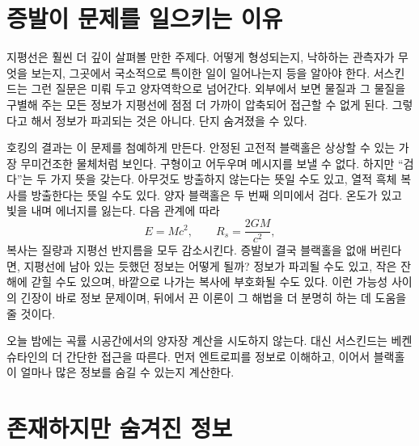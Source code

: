 \begin{classroomqa}\end{classroomqa}

\section{증발이 문제를 일으키는 이유}

지평선은 훨씬 더 깊이 살펴볼 만한 주제다. 어떻게 형성되는지, 낙하하는 관측자가 무엇을 보는지, 그곳에서 국소적으로 특이한 일이 일어나는지 등을 알아야 한다. 서스킨드는 그런 질문은 미뤄 두고 양자역학으로 넘어간다. 외부에서 보면 물질과 그 물질을 구별해 주는 모든 정보가 지평선에 점점 더 가까이 압축되어 접근할 수 없게 된다. 그렇다고 해서 정보가 파괴되는 것은 아니다. 단지 숨겨졌을 수 있다.

호킹의 결과는 이 문제를 첨예하게 만든다. 안정된 고전적 블랙홀은 상상할 수 있는 가장 무미건조한 물체처럼 보인다. 구형이고 어두우며 메시지를 보낼 수 없다. 하지만 ``검다''는 두 가지 뜻을 갖는다. 아무것도 방출하지 않는다는 뜻일 수도 있고, 열적 흑체 복사를 방출한다는 뜻일 수도 있다. 양자 블랙홀은 두 번째 의미에서 검다. 온도가 있고 빛을 내며 에너지를 잃는다. 다음 관계에 따라
\begin{equation}
E=Mc^2,
\qquad
R_s=\frac{2GM}{c^2},
\end{equation}
복사는 질량과 지평선 반지름을 모두 감소시킨다. 증발이 결국 블랙홀을 없애 버린다면, 지평선에 남아 있는 듯했던 정보는 어떻게 될까? 정보가 파괴될 수도 있고, 작은 잔해에 갇힐 수도 있으며, 바깥으로 나가는 복사에 부호화될 수도 있다. 이런 가능성 사이의 긴장이 바로 정보 문제이며, 뒤에서 끈 이론이 그 해법을 더 분명히 하는 데 도움을 줄 것이다.

오늘 밤에는 곡률 시공간에서의 양자장 계산을 시도하지 않는다. 대신 서스킨드는 베켄슈타인의 더 간단한 접근을 따른다. 먼저 엔트로피를 정보로 이해하고, 이어서 블랙홀이 얼마나 많은 정보를 숨길 수 있는지 계산한다.

\section{존재하지만 숨겨진 정보}

